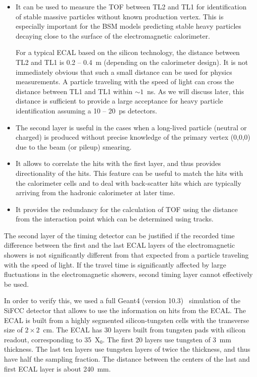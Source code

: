\documentclass[final,1p,11pt]{elsarticle}
\begin{document}
\begin{itemize}

\item
It can be used to measure the TOF between TL2 and TL1 for identification
of stable massive particles without known production vertex. This is especially important
for the BSM models predicting stable heavy particles
decaying close to the surface of the electromagnetic calorimeter.     

For a typical ECAL based on the silicon technology, the distance between TL2 and TL1 is  0.2 -- 0.4~m (depending on the calorimeter design).
It is not immediately obvious that such a small distance can be used for physics measurements. 
A particle traveling with the speed of light can cross the distance between TL1 and TL1 within $\sim 1$~ns.
As we will discuss later, this distance is sufficient to provide a large acceptance 
for heavy particle identification  assuming a 10 -- 20~ps detectors. 

\item
The second layer is  useful in the cases when a long-lived particle (neutral or charged) is produced without precise knowledge of the primary vertex (0,0,0)
due to the beam (or pileup) smearing. 

\item
It allows to correlate the hits with the first layer, and thus provides directionality of the hits. This feature can be useful to
match the hits with the calorimeter cells and to deal with back-scatter 
hits which are typically arriving from the hadronic calorimeter at later time. 

\item
It provides the redundancy for the calculation of TOF using the distance from the interaction point which can be determined using tracks.

\end{itemize}


The second layer of the timing detector can be justified if the recorded time difference between
the first and the last ECAL  
layers of the electromagnetic showers is not significantly different from that expected from a particle traveling with the speed of light.
If the travel time is significantly affected by large fluctuations in the electromagnetic showers,    
second timing layer cannot effectively be used.

In order to verify this, we used a full Geant4 (version 10.3)~\cite{Allison2016186} simulation 
of the SiFCC detector \cite{Chekanov:2016ppq} that allows to use the information on hits from the ECAL.
The ECAL is built from a highly segmented silicon-tungsten cells with the transverse size of $2 \times 2$~cm.
The ECAL has 30 layers built from tungsten pads with silicon readout,
corresponding to 35~X$_{0}$. The first 20 layers use tungsten of 3~mm thickness.
The last ten layers use tungsten layers of
twice the thickness, and thus have half the  sampling fraction.  
The distance between the centers of the last and first ECAL layer is about 240~mm.  
\end{document}

